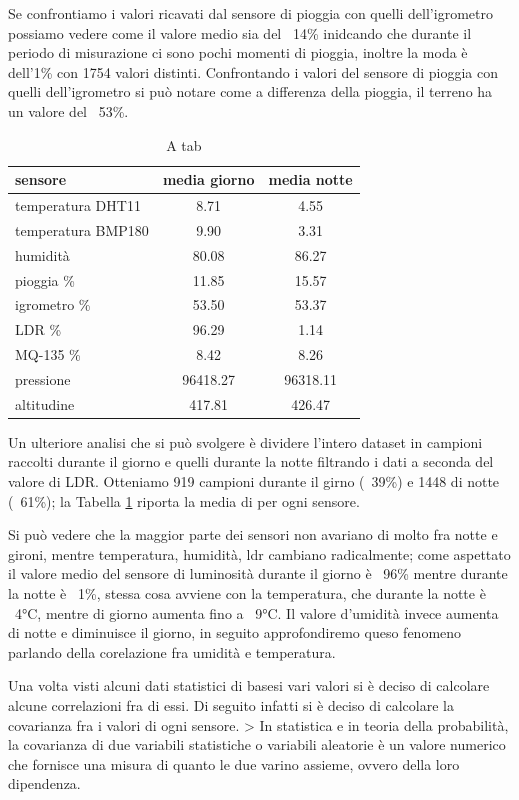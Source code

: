 \documentclass[a4paper, 12pt]{report}
\begin{document}
Se confrontiamo i valori ricavati dal sensore di pioggia con quelli dell'igrometro possiamo vedere come il valore medio sia del ~14\% inidcando che durante il periodo di misurazione ci sono pochi 
momenti di pioggia, inoltre la moda è dell'1\% con 1754 valori distinti. Confrontando i valori del sensore di pioggia con quelli dell'igrometro si può notare come a differenza 
della pioggia, il terreno ha un valore del ~53\%.

\begin{table}
  \centering
  \begin{tabular}{ l c c }
  sensore & media giorno & media notte \\
  \hline
  temperatura DHT11 & 8.71 & 4.55 \\
  \hline
  temperatura BMP180 & 9.90 & 3.31 \\
  \hline
  humidità & 80.08 & 86.27 \\
  \hline
  pioggia \% & 11.85 & 15.57 \\
  \hline
  igrometro \% & 53.50 & 53.37 \\
  \hline
  LDR \% & 96.29 & 1.14 \\
  \hline
  MQ-135 \% & 8.42 & 8.26 \\
  \hline
  pressione & 96418.27 & 96318.11 \\
  \hline
  altitudine & 417.81 & 426.47 \\
  \hline
  \end{tabular}
  \caption{A tab}
  \label{tab:daynight}
\end{table}

Un ulteriore analisi che si può svolgere è dividere l'intero dataset in campioni raccolti durante il giorno e quelli durante la notte filtrando i dati a seconda del valore di LDR. 
Otteniamo 919 campioni durante il girno (~39\%) e 1448 di notte (~61\%); la Tabella \ref{tab:daynight} riporta la media di per ogni sensore.

Si può vedere che la maggior parte dei sensori non avariano di molto fra notte e gironi, mentre temperatura, humidità, ldr cambiano radicalmente; come aspettato il valore medio 
del sensore di luminosità durante il giorno è ~96\% mentre durante la notte è ~1\%, stessa cosa avviene con la temperatura, che durante la notte è ~4°C, mentre di 
giorno aumenta fino a ~9°C. Il valore d'umidità invece aumenta di notte e diminuisce il giorno, in seguito approfondiremo queso fenomeno parlando della corelazione fra umidità e temperatura.

Una volta visti alcuni dati statistici di basesi vari valori si è deciso di calcolare alcune correlazioni fra di essi. Di seguito infatti si è deciso di calcolare la covarianza fra i valori di ogni sensore. 
> In statistica e in teoria della probabilità, la covarianza di due variabili statistiche o variabili aleatorie è un valore numerico che fornisce una misura di quanto le due varino assieme, ovvero della loro dipendenza.
\end{document}
